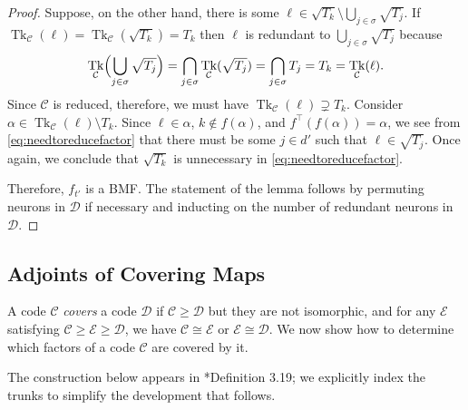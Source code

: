 \documentclass[11pt,letterpaper, reqno]{amsart}
\theoremstyle{definition}
\DeclareMathOperator{\tk}{Tk}
\def\cC{\mathcal{C}}
\def\cD{\mathcal{D}}
\def\cE{\mathcal{E}}
\begin{document}
\begin{proof}
            Suppose, on the other hand, there is some $\ell \in \sqrt{T_k} \setminus \bigcup_{j\in\sigma}\sqrt{T_j}$. If $\tk_\cC(\ell) = \tk_\cC(\sqrt{T_k}) =T_k$
            then $\ell$ is redundant to $\bigcup_{j\in\sigma} \sqrt{T_j}$
            because
                \[ \tk_\cC\Bigl(\bigcup_{j\in\sigma} \sqrt{T_j}\Bigr) = \bigcap_{j\in\sigma} \tk_\cC(\sqrt{T_j}) = \bigcap_{j\in\sigma} T_j = T_k = \tk_\cC(\ell). \]
            Since $\cC$ is reduced, therefore, we must have $\tk_\cC(\ell) \supsetneq T_k$.
            Consider $\alpha \in \tk_\cC(\ell) \setminus T_k$. Since $\ell \in \alpha$, $k \notin f(\alpha)$, and $f^\top(f(\alpha)) = \alpha$, we see from \eqref{eq:needtoreducefactor} that there must be some $j \in d'$ such that $\ell \in \sqrt{T_j}$. Once again, we conclude that $\sqrt{T_k}$ is unnecessary in \eqref{eq:needtoreducefactor}.

            Therefore, $f_{t'}$ is a BMF.
            The statement of the lemma follows by permuting neurons in $\cD$ if necessary and inducting on the number of redundant neurons in $\cD$.
        \end{proof}


    \subsection{Adjoints of Covering Maps}\label{sec:adjointsofcovering}
        A code $\cC$ \emph{covers} a code $\cD$ if $\cC \geq \cD$ but they are not isomorphic, and for any $\cE$ satisfying $\cC \geq \cE \geq \cD$, we have $\cC \cong \cE$ or $\cE \cong \cD$.
        We now show how to determine which factors of a code $\cC$ are covered by it.
        
        The construction below appears in \cite{jeffs2019sunflowers}*{Definition 3.19}; %
        we explicitly index the trunks to simplify the development that follows.
\end{document}
